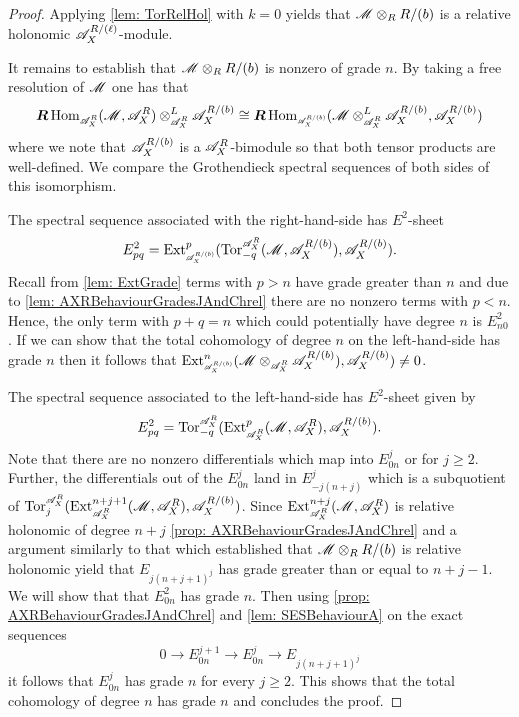\begin{proof}
  Applying \cref{lem: TorRelHol} with $k=0$ yields that $\mathscr{M} \otimes_R R/(b)$ is a relative holonomic $\mathscr{A}_X^{R/(\ell)}$-module.

  It remains to establish that $\mathscr{M} \otimes_R R/(b)$ is nonzero of grade $n$.
  By taking a free resolution of $\mathscr{M}$ one has that
  $$\bR\Hom_{\scaleto{\A_X^R}{8pt}}(\M,\A_X^R)\otimes_{\scaleto{\A_X^R}{8pt}}^L \A_X^{R/(b)} \cong \bR \Hom_{\scaleto{\A_X^{R/(b)}}{8pt}}(\M\otimes_{\scaleto{\A_X^R}{8pt}}^L \A_X^{R/(b)}, \A_X^{R/(b)}) $$
  where we note that $\mathscr{A}_X^{R/(b)}$ is a $\mathscr{A}_X^{R}$-bimodule so that both tensor products are well-defined.
  We compare the Grothendieck spectral sequences of both sides of this isomorphism.

  The spectral sequence associated with the right-hand-side has $E^2$-sheet
  $$E_{pq}^2 = \Ex{\A_X^{R/(b)}}{p}(\Tr{\A_X^R}{-q}(\M, \A_X^{R/(b)}), \A_X^{R/(b)}).$$
  Recall from \cref{lem: ExtGrade} terms with $p>n$ have grade greater than $n$ and due to \cref{lem: AXRBehaviourGradesJAndChrel} there are no nonzero terms with $p<n$.
  Hence, the only term with $p+q = n$ which could potentially have degree $n$ is $E_{n0}^2$.
  If we can show that the total cohomology of degree $n$ on the left-hand-side has grade $n$ then it follows that $\Ex{\A_X^{R/(b)}}{n}(\M\otimes_{\scaleto{\A_X^R}{8pt}} \A_X^{R/(b)}), \A_X^{R/(b)}) \neq 0$.

  The spectral sequence associated to the left-hand-side has $E^2$-sheet given by
  $$E^2_{pq} =\Tr{\A_X^R}{-q}( \Ex{\A_X^R}{p}(\M,\A_X^R), \A_X^{R/(b)}).$$
  Note that there are no nonzero differentials which map into $E^j_{0n}$ or for $j\geq 2$.
  Further, the differentials out of the $E_{0n}^j$ land in $E_{-j(n+j)}^j$ which is a subquotient of $\Tr{\A_X^R}{j}(\Ex{\A_X^R}{n+j+1}(\M,\ab \A_X^R)\ab , \A_X^{R/(b)})$.
  Since $\Ex{\A_X^R}{n+j}(\M,\A_X^R)$ is relative holonomic of degree $n+j$ \cref{prop: AXRBehaviourGradesJAndChrel} and a argument similarly to that which established that $\mathscr{M} \otimes_R R/(b)$ is relative holonomic yield that $E_{j(n+j+1)^j}$ has grade greater than or equal to $n+j-1$.
  We will show that that $E^2_{0n}$ has grade $n$.
  Then using \cref{prop: AXRBehaviourGradesJAndChrel} and \cref{lem: SESBehaviourA} on the exact sequences
  $$0 \to E^{j+1}_{0n}\to  E^j_{0n} \to E_{j(n+j+1)^j} $$
  it follows that $E^j_{0n}$ has grade $n$ for every $j\geq 2$.
  This shows that the total cohomology of degree $n$ has grade $n$ and concludes the proof.


\end{proof}
